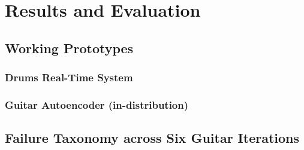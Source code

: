 \chapter{Results and Evaluation}
\label{ch:results}

\section{Working Prototypes}
\label{sec:results_prototypes}

\subsection{Drums Real-Time System}
\label{sec:results_drums}

\subsection{Guitar Autoencoder (in-distribution)}
\label{sec:results_guitar_ae}

\section{Failure Taxonomy across Six Guitar Iterations}
\label{sec:results_failures}


